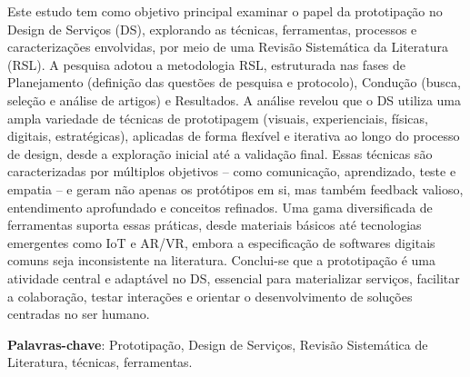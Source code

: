 \begin{resumo}

Este estudo tem como objetivo principal examinar o papel da prototipação no Design de Serviços (DS), explorando as técnicas, ferramentas, processos e caracterizações envolvidas, por meio de uma Revisão Sistemática da Literatura (RSL). A pesquisa adotou a metodologia RSL, estruturada nas fases de Planejamento (definição das questões de pesquisa e protocolo), Condução (busca, seleção e análise de artigos) e Resultados. A análise revelou que o DS utiliza uma ampla variedade de técnicas de prototipagem (visuais, experienciais, físicas, digitais, estratégicas), aplicadas de forma flexível e iterativa ao longo do processo de design, desde a exploração inicial até a validação final. Essas técnicas são caracterizadas por múltiplos objetivos – como comunicação, aprendizado, teste e empatia – e geram não apenas os protótipos em si, mas também feedback valioso, entendimento aprofundado e conceitos refinados. Uma gama diversificada de ferramentas suporta essas práticas, desde materiais básicos até tecnologias emergentes como IoT e AR/VR, embora a especificação de softwares digitais comuns seja inconsistente na literatura. Conclui-se que a prototipação é uma atividade central e adaptável no DS, essencial para materializar serviços, facilitar a colaboração, testar interações e orientar o desenvolvimento de soluções centradas no ser humano.

 \vspace{\onelineskip}
	
 \noindent
 \textbf{Palavras-chave}: Prototipação, Design de Serviços, Revisão Sistemática de Literatura, técnicas, ferramentas.
\end{resumo}

